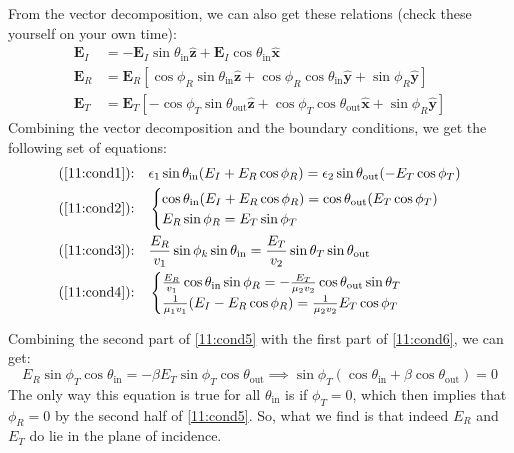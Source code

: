 From the vector decomposition, we can also get these relations (check these yourself on your own time): 
\begin{align*}
	\mathbf{E}_I &= - \mathbf{E}_I \sin \theta_\text{in} \mathbf{\hat{z}} + \mathbf{E}_I \cos
	\theta_\text{in}\mathbf{\hat{x}}\\
	\mathbf{E}_R &= \mathbf{E}_R \left[ \cos \phi_R \sin \theta_\text{in}\mathbf{\hat{z}} + \cos \phi_R \cos
	\theta_\text{in} \mathbf{\hat{y}} + \sin \phi_R \mathbf{\hat{y}}\right]\\
	\mathbf{E}_T &= \mathbf{E}_T \left[ -\cos \phi_T \sin \theta_\text{out} \mathbf{\hat{z}} + \cos \phi_T
	\cos \theta_\text{out} \mathbf{\hat{x}} + \sin \phi_R \mathbf{\hat{y}} \right] 
\end{align*}
Combining the vector decomposition and the boundary conditions, we get the following set of equations:
\begin{align}
	\text{(\ref{11:cond1}):} \quad & \epsilon_1 \sin \theta_\text{in}(E_I + E_R \cos \phi_R) = \epsilon_2 \sin
	\theta_\text{out}(-E_T \cos \phi_T)\\
	\label{11:cond5} \text{(\ref{11:cond2}):} \quad & \begin{cases}
		\cos \theta_\text{in}(E_I + E_R \cos \phi_R) = \cos \theta_\text{out} (E_T \cos \phi_T)\\
		E_R \sin \phi_R = E_T \sin \phi_T \\ 
	\end{cases}\\
	\text{(\ref{11:cond3}):} \quad & \frac{E_R}{v_1} \sin \phi_k \sin \theta_\text{in} = \frac{E_T}{v_2}\sin \theta_T
	\sin \theta_\text{out}\\
	\label{11:cond6} \text{(\ref{11:cond4}):} \quad & \begin{cases}
		\frac{E_R}{v_1}\cos \theta_\text{in} \sin \phi_R = - \frac{E_T}{\mu_2v_2} \cos \theta_\text{out} \sin
		\theta_T\\
		\frac{1}{\mu_1v_1}(E_I - E_R \cos \phi_R) = \frac{1}{\mu_2v_2} E_T \cos \phi_T
	\end{cases}
\end{align}

Combining the second part of \ref{11:cond5} with the first part of \ref{11:cond6}, we can get:
\[
	E_R \sin \phi_T \cos \theta_\text{in} = -\beta E_T \sin\phi_T \cos \theta_\text{out} \implies
	\sin \phi_T(\cos \theta_\text{in} + \beta \cos \theta_\text{out}) = 0
\]
The only way this equation is true for all \( \theta_\text{in} \) is if \( \phi_T = 0 \), which then implies
that \( \phi_R = 0 \) by the second half of \ref{11:cond5}. So, what we find is that indeed \( E_R \) and \(
E_T\) do lie in the plane of incidence.  

